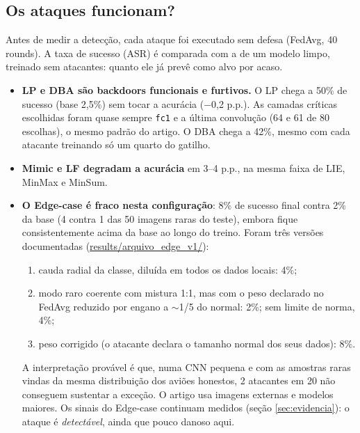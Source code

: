 \documentclass[11pt,a4paper]{article}
\newcommand{\res}{../fl-robustness-lab/results}
\begin{document}
\subsection{Os ataques funcionam?}
Antes de medir a detecção, cada ataque foi executado sem defesa (FedAvg, 40 rounds). A taxa de sucesso
(ASR) é comparada com a de um modelo limpo, treinado sem atacantes: quanto ele já prevê como alvo por
acaso.

\begin{table}[htbp]
\centering
\small
\caption{Efeito de cada ataque sem defesa (semente 42). $\Delta$MA em relação ao FedAvg sem ataque
(72,8\%). Asterisco: ataques recentes.}
\label{tab:efeito}

\end{table}

\begin{itemize}
  \item \textbf{LP e DBA são backdoors funcionais e furtivos.} O LP chega a 50\% de sucesso (base 2,5\%)
        sem tocar a acurácia ($-$0,2 p.p.). As camadas críticas escolhidas foram quase sempre
        \texttt{fc1} e a última convolução (64 e 61 de 80 escolhas), o mesmo padrão do artigo. O DBA chega a
        42\%, mesmo com cada atacante treinando só um quarto do gatilho.
  \item \textbf{Mimic e LF degradam a acurácia} em 3--4 p.p., na mesma faixa de LIE, MinMax e MinSum.
  \item \textbf{O Edge-case é fraco nesta configuração}: 8\% de sucesso final contra 2\% da base (4 contra
        1 das 50 imagens raras do teste), embora fique consistentemente acima da base ao longo do treino.
        Foram três versões documentadas (\url{results/arquivo_edge_v1/}):
        \begin{enumerate}
          \item cauda radial da classe, diluída em todos os dados locais: 4\%;
          \item modo raro coerente com mistura 1:1, mas com o peso declarado no FedAvg reduzido por engano
                a $\sim$1/5 do normal: 2\%; sem limite de norma, 4\%;
          \item peso corrigido (o atacante declara o tamanho normal dos seus dados): 8\%.
        \end{enumerate}
        A interpretação provável é que, numa CNN pequena e com as amostras raras vindas da mesma
        distribuição dos aviões honestos, 2 atacantes em 20 não conseguem sustentar a exceção. O artigo
        usa imagens externas e modelos maiores. Os sinais do Edge-case continuam medidos (seção
        \ref{sec:evidencia}): o ataque é \emph{detectável}, ainda que pouco danoso aqui.
\end{itemize}
\end{document}
